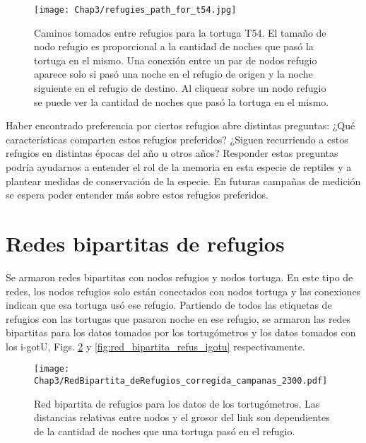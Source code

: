 \begin{figure}[ht]
    \begin{center}
        \texttt{[image: Chap3/refugies\_path\_for\_t54.jpg]}
        \caption[Caminos tomados entre refugios para la tortuga T54.]{Caminos tomados entre refugios para la tortuga T54. El tamaño de nodo refugio es proporcional a la cantidad de noches que pasó la tortuga en el mismo. Una conexión entre un par de nodos refugio aparece solo si pasó una noche en el refugio de origen y la noche siguiente en el refugio de destino. Al cliquear sobre un nodo refugio se puede ver la cantidad de noches que pasó la tortuga en el mismo.}
        \label{fig:ruta_refus_T54}
       
        \end{center}
\end{figure}
Haber encontrado preferencia por ciertos refugios abre distintas preguntas: ¿Qué características comparten estos refugios preferidos? ¿Siguen recurriendo a estos refugios en distintas épocas del año u otros años?  Responder estas preguntas podría ayudarnos a entender el rol de la memoria en esta especie de reptiles y a plantear medidas de conservación de la especie. En futuras campañas de medición se espera poder entender más sobre estos refugios preferidos.
 
 
 
\section{Redes bipartitas de refugios}
Se armaron redes bipartitas con nodos refugios y nodos tortuga. En este tipo de redes, los nodos refugios solo están conectados con nodos tortuga y las conexiones indican que esa tortuga usó ese refugio. Partiendo de todos las etiquetas de refugios con las tortugas que pasaron noche en ese refugio, se armaron las redes bipartitas para los datos tomados por los tortugómetros y los datos tomados con los i-gotU, Figs. \ref{fig:red_bipartita_refus_campanas} y \ref{fig:red_bipartita_refus_igotu} respectivamente.
 
\begin{figure}[ht]
    \begin{center}
        \texttt{[image: Chap3/RedBipartita\_deRefugios\_corregida\_campanas\_2300.pdf]}
        \caption[Red bipartita de refugios para los datos de los tortugómetros.]{Red bipartita de refugios para los datos de los tortugómetros. Las distancias relativas entre nodos y el grosor del link son dependientes de la cantidad de noches que una  tortuga pasó en el refugio. }
        \label{fig:red_bipartita_refus_campanas}
       
        \end{center}
\end{figure}
 
